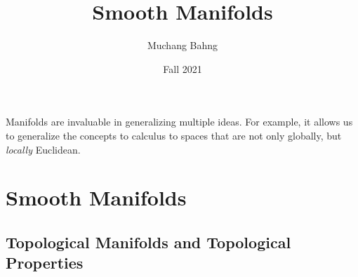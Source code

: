 \documentclass{article}
\newcounter{example}[section]
\begin{document}
\title{Smooth Manifolds}
\author{Muchang Bahng}
\date{Fall 2021}

\maketitle
\tableofcontents
\pagebreak

Manifolds are invaluable in generalizing multiple ideas. For example, it allows us to generalize the concepts to calculus to spaces that are not only globally, but \textit{locally} Euclidean. 

\section{Smooth Manifolds}

  \subsection{Topological Manifolds and Topological Properties}
\end{document}
